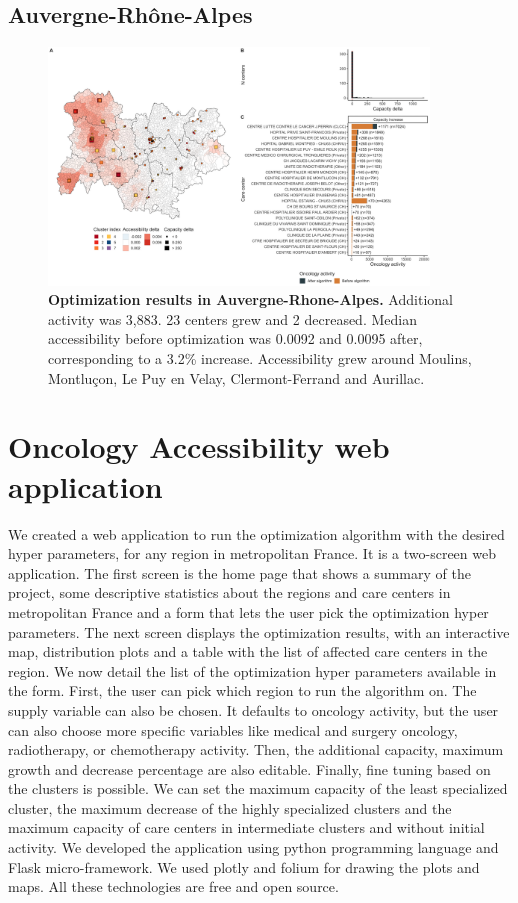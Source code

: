 \subsection*{Auvergne-Rhône-Alpes}

\begin{figure}[H]
    \includegraphics[width=0.9\textwidth]{images/camion/optim_region/optim_Auvergne-Rhone-Alpes.png}
    \centering
    \caption{
        \textbf{Optimization results in Auvergne-Rhone-Alpes.} Additional activity was 3,883. 23 centers grew and 2 decreased. Median accessibility before optimization was 0.0092 and 0.0095 after, corresponding to a 3.2\% increase. Accessibility grew around Moulins, Montluçon, Le Puy en Velay, Clermont-Ferrand and Aurillac.
    }
\end{figure}

\section{Oncology Accessibility web application}

We created a web application to run the optimization algorithm with the desired hyper parameters, for any region in metropolitan France. It is a two-screen web application. The first screen is the home page that shows a summary of the project, some descriptive statistics about the regions and care centers in metropolitan France and a form that lets the user pick the optimization hyper parameters. The next screen displays the optimization results, with an interactive map, distribution plots and a table with the list of affected care centers in the region. We now detail the list of the optimization hyper parameters available in the form. First, the user can pick which region to run the algorithm on. The supply variable can also be chosen. It defaults to oncology activity, but the user can also choose more specific variables like medical and surgery oncology, radiotherapy, or chemotherapy activity. Then, the additional capacity, maximum growth and decrease percentage are also editable. Finally, fine tuning based on the clusters is possible. We can set the maximum capacity of the least specialized cluster, the maximum decrease of the highly specialized clusters and the maximum capacity of care centers in intermediate clusters and without initial activity. We developed the application using python programming language and Flask micro-framework. We used plotly and folium for drawing the plots and maps. All these technologies are free and open source.

